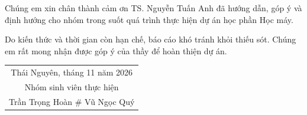 
Chúng em xin chân thành cảm ơn TS. Nguyễn Tuấn Anh đã hướng dẫn, góp ý và định hướng cho nhóm trong suốt quá trình thực hiện dự án học phần Học máy.

Do kiến thức và thời gian còn hạn chế, báo cáo khó tránh khỏi thiếu sót. Chúng em rất mong nhận được góp ý của thầy để hoàn thiện dự án.

\vspace{1cm}
\begin{flushright}
\begin{tabular}{c}
Thái Nguyên, tháng 11 năm 2026\\
Nhóm sinh viên thực hiện\\[1.8cm]
Trần Trọng Hoàn \# \qquad Vũ Ngọc Quý
\end{tabular}
\end{flushright}
